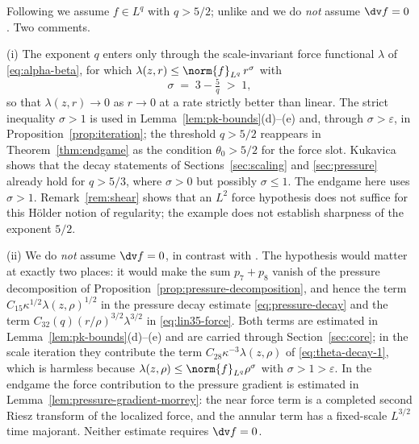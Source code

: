 \documentclass[11pt,reqno]{amsart}
\begin{document}
\begin{remark}\label{rem:force}
Following \cite{CKN1982} we assume $f\in L^{q}$ with $q>5/2$; unlike
\cite{Kukavica2008} and \cite[Definition 13.4]{LemarieRieusset2016} we do
\emph{not} assume $\dv f=0$. Two comments.

(i) The exponent $q$ enters only through the scale-invariant force functional
$\lambda$ of \eqref{eq:alpha-beta}, for which
$\lambda(z,r)\le\norm{f}_{L^{q}}\,r^{\sigma}$ with
\begin{equation}\label{eq:sigma}
  \sigma\;=\;3-\tfrac5q\;>\;1 ,
\end{equation}
so that $\lambda(z,r)\to0$ as $r\to0$ at a rate strictly better than linear.
The strict inequality $\sigma>1$ is used in Lemma~\ref{lem:pk-bounds}(d)--(e)
and, through $\sigma>\varepsilon$, in Proposition~\ref{prop:iteration}; the
threshold $q>5/2$ reappears in Theorem~\ref{thm:endgame} as the condition
$\theta_{0}>5/2$ for the force slot.
Kukavica \cite[Theorem 2]{Kukavica2008} shows that the decay statements of
Sections~\ref{sec:scaling} and \ref{sec:pressure} already hold for $q>5/3$,
where $\sigma>0$ but possibly $\sigma\le1$. The endgame here uses
$\sigma>1$. Remark~\ref{rem:shear} shows that an $L^{2}$ force hypothesis
does not suffice for this H\"older notion of regularity; the example does
not establish sharpness of the exponent $5/2$.
%
%

(ii) We do \emph{not} assume $\dv f=0$, in contrast with
\cite{Kukavica2008}. The hypothesis would matter at exactly two places: it would
make the sum $p_{7}+p_{8}$ vanish of the pressure decomposition of
Proposition~\ref{prop:pressure-decomposition}, and hence the term
$C_{15}\kappa^{1/2}\lambda(z,\rho)^{1/2}$ in the pressure decay estimate
\eqref{eq:pressure-decay} and the term
$C_{32}(q)(r/\rho)^{3/2}\lambda^{3/2}$ in \eqref{eq:lin35-force}. Both terms are estimated in
Lemma~\ref{lem:pk-bounds}(d)--(e) and are carried through
Section~\ref{sec:core}; in the scale iteration they contribute the term
$C_{28}\kappa^{-3}\lambda(z,\rho)$ of \eqref{eq:theta-decay-1}, which is
harmless because $\lambda(z,\rho)\le\norm{f}_{L^{q}}\rho^{\sigma}$ with
$\sigma>1>\varepsilon$. In the endgame the force contribution to the pressure gradient is
estimated in Lemma~\ref{lem:pressure-gradient-morrey}: the near force
term is a completed second Riesz transform of the localized force, and
the annular term has a fixed-scale $L^{3/2}$ time majorant. Neither
estimate requires $\dv f=0$.
\end{remark}
\end{document}
